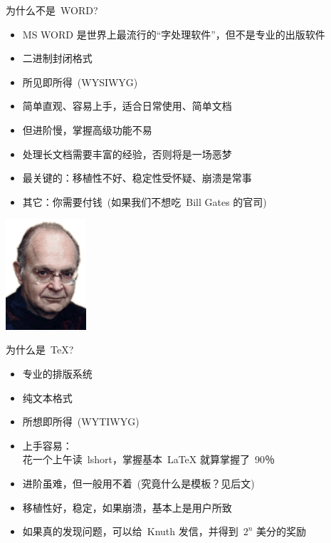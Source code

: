 \documentclass[dvipsnames, svgnames, mode=present, paper=screen, size=9pt,
style=husky]{powerdot}
\begin{document}
\begin{CJK*}{GBK}{song}
\begin{slide}{为什么不是~WORD?}
  \begin{itemize}
  \item MS WORD 是世界上最流行的“字处理软件”，但不是专业的出版软件
  \item 二进制封闭格式
  \item 所见即所得~(WYSIWYG)
  \item 简单直观、容易上手，适合日常使用、简单文档
  \item 但进阶慢，掌握高级功能不易
  \item 处理长文档需要丰富的经验，否则将是一场恶梦
  \item 最关键的：移植性不好、稳定性受怀疑、崩溃是常事
  \item 其它：你需要付钱~(如果我们不想吃~Bill Gates 的官司)
  \end{itemize}
  \bigskip
\centering
\includegraphics[width=3cm]{knuth.png}%
\end{slide}

\begin{slide}{为什么是~\TeX ?}
  \begin{itemize}
  \item 专业的排版系统\\

  \item 纯文本格式 
  \item 所想即所得~(WYTIWYG)
  \item 上手容易：\\
        花一个上午读~lshort，掌握基本~\LaTeX{} 就算掌握了~90％
  \item 进阶虽难，但一般用不着~(究竟什么是模板？见后文)
  \item 移植性好，稳定，如果崩溃，基本上是用户所致
  \item 如果真的发现问题，可以给~Knuth 发信，并得到~{\color{blue}$2^{n}$} 美分的奖励
  \end{itemize}
\end{slide}


\end{CJK*}
\end{document}
